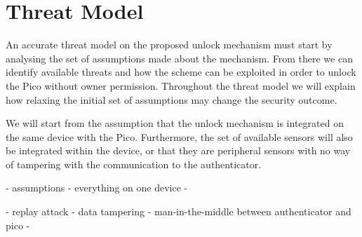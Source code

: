 
\chapter{Threat Model} %

\label{ChapterX} %


An accurate threat model on the proposed unlock mechanism must start by analysing the set of assumptions made about the mechanism. From there we can identify available threats and how the scheme can be exploited in order to unlock the Pico without owner permission. Throughout the threat model we will explain how relaxing the initial set of assumptions may change the security outcome.

We will start from the assumption that the unlock mechanism is integrated on the same device with the Pico. Furthermore, the set of available sensors will also be integrated within the device, or that they are peripheral sensors with no way of tampering with the communication to the authenticator. 



- assumptions
  - everything on one device
  - 
  
  
- replay attack
- data tampering
- man-in-the-middle between authenticator and pico
- 